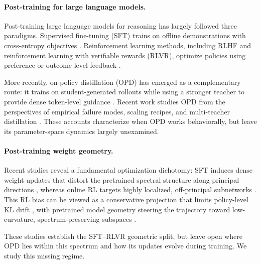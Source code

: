 \paragraph{Post-training for large language models.} Post-training large language models for reasoning has largely followed
three paradigms. Supervised fine-tuning (SFT) trains on offline
demonstrations with cross-entropy objectives
\cite{howard2018universallanguagemodelfinetuning,
dodge2020finetuningpretrainedlanguagemodels,
wei2022finetunedlanguagemodelszeroshot}. Reinforcement learning methods,
including RLHF and reinforcement learning with verifiable rewards (RLVR),
optimize policies using preference or outcome-level feedback
\cite{ziegler2020finetuninglanguagemodelshuman,
ouyang2022traininglanguagemodelsfollow,
shao2024deepseekmathpushinglimitsmathematical, guo2025deepseek}. 

More recently, on-policy distillation (OPD) has emerged
as a complementary route: it trains on student-generated rollouts while
using a stronger teacher to provide dense token-level guidance
\cite{lu2025onpolicydistillation,
song2026surveyonpolicydistillationlarge}. Recent work studies OPD from
the perspectives of empirical failure modes, scaling recipes, and
multi-teacher distillation
\cite{fu2026revisitingonpolicydistillationempirical,
li2026rethinkingonpolicydistillationlarge,
deepseekai2026deepseekv4,
yang2025qwen3technicalreport}. These accounts characterize when OPD works
behaviorally, but leave its parameter-space dynamics largely unexamined.
\paragraph{Post-training weight geometry.}
Recent studies reveal a fundamental 
optimization dichotomy: SFT induces dense weight updates that distort the 
pretrained spectral structure along principal directions 
\cite{liu2026liftveiltruthprincipal}, whereas online RL targets highly localized, 
off-principal subnetworks 
\cite{mukherjee2025reinforcementlearningfinetunessmall}. This RL bias can be 
viewed as a conservative projection that limits policy-level KL drift 
\cite{shenfeld2025rlsrazoronlinereinforcement, wu2026invisibleleashrlvrescape}, 
with pretrained model geometry steering the trajectory toward low-curvature, 
spectrum-preserving subspaces \cite{zhu2025pnt}.

These studies establish the SFT--RLVR geometric split, but leave open where
OPD lies within this spectrum and how its updates evolve during training.
We study this missing regime.